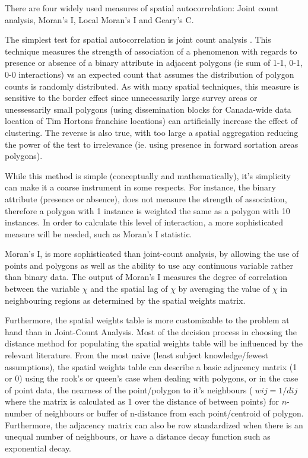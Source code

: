 \documentclass[12pt,letterpaper,notitlepage,onecolumn,final,openbib]{article}
\begin{document}
	There are four widely used measures of spatial autocorrelation: Joint count analysis, Moran's I, Local Moran's I and Geary's C.    
	
	The simplest test for spatial autocorrelation is joint count analysis \cite{LeeWong2001}. This technique measures the strength of association of a phenomenon with regards to presence or absence of a binary attribute in adjacent polygons (ie sum of 1-1, 0-1, 0-0 interactions) vs an expected count that assumes the distribution of polygon counts is randomly distributed. As with many spatial techniques, this measure is sensitive to the border effect since unnecessarily large survey areas or unessessarily small polygons (using dissemination blocks for Canada-wide data location of Tim Hortons franchise locations) can artificially increase the effect of clustering.  The reverse is also true, with too large a spatial aggregation reducing the power of the test to irrelevance (ie. using presence in forward sortation areas polygons).   
	
	While this method is simple (conceptually and mathematically), it's simplicity can make it a coarse instrument in some respects.  For instance, the binary attribute (presence or absence), does not measure the strength of association, therefore a polygon with 1 instance is weighted the same as a polygon with 10 instances.  In order to calculate this level of interaction, a more sophisticated measure will be needed, such as Moran's I statistic.  
	
	Moran's I, is more sophisticated than joint-count analysis, by allowing the use of points and  polygons as well as the ability to use any continuous variable rather than binary data.  The output of Moran's I measures the degree of correlation between the variable $\chi$ and the spatial lag of $\chi$ by averaging the value of $\chi$ in neighbouring regions as determined by the spatial weights matrix. 
	
	Furthermore, the spatial weights table is more customizable to the problem at hand than in Joint-Count Analysis.  Most of the decision process in choosing the distance method for populating the spatial weights table will be influenced by the relevant literature.  From the most naive (least subject knowledge/fewest assumptions), the spatial weights table can describe a basic adjacency matrix (1 or 0) using the rook's or queen's case when dealing with polygons, or in the case of point data, the nearness of the point/polygon to it's neighbours ( $wij = 1/dij$ where the matrix is calculated as 1 over the distance of between points) for $n$-number of neighbours or buffer of n-distance from each point/centroid of polygon.  Furthermore, the adjacency matrix can also be row standardized when there is an unequal number of neighbours, or have a distance decay function such as exponential decay.   
	
\end{document}
